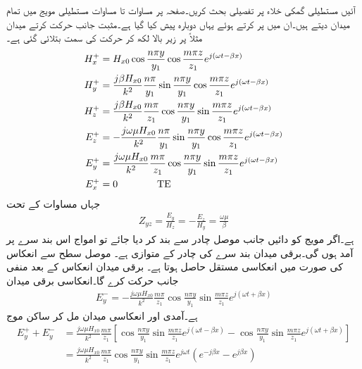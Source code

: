 آئیں مستطیلی گمکی خلاء پر تفصیلی بحث کریں۔صفحہ  پر مساوات  تا مساوات  مستطیلی مویج میں تمام  میدان دیتے ہیں۔ان میں  پر کرتے ہوئے یہاں دوبارہ پیش کیا گیا ہے۔مثبت  جانب حرکت کرتے میدان مثلاً  پر زیر بالا  لکھ کر حرکت کی سمت بتلائی گئی ہے۔
 \begin{align}
H_x^{+}&=H_{x0} \cos \frac{n \pi y}{y_1}  \cos  \frac{m \pi z}{z_1} e^{j (\omega t -\beta x)}\\
H_y^{+}&=\frac{j \beta H_{x0}}{k^2}\frac{n \pi}{y_1} \sin \frac{n\pi y}{y_1} \cos \frac{m \pi z}{z_1} e^{j (\omega t -\beta x)} \\
H_z^{+}&=\frac{j \beta H_{x0}}{k^2}\frac{m \pi}{z_1} \cos \frac{n\pi y}{y_1} \sin \frac{m \pi z}{z_1} e^{j (\omega t -\beta x)}\\
E_z^{+}&=-\frac{j \omega \mu H_{x0}}{k^2}\frac{n \pi}{y_1} \sin \frac{n\pi y}{y_1} \cos \frac{m \pi z}{z_1} e^{j (\omega t -\beta x)}\\
E_y^{+}&=\frac{j \omega \mu H_{x0}}{k^2}\frac{m \pi}{z_1}\cos \frac{n\pi y}{y_1} \sin \frac{m \pi z}{z_1} e^{j (\omega t -\beta x)}\\
E_x^{+}&=0 \quad \quad \quad \quad \textup{TE}_{}
\end{align}
جہاں مساوات  کے تحت
\begin{align}
Z_{yz}=\frac{E_y}{H_z}=-\frac{E_z}{H_y}=\frac{\omega \mu}{\beta}
\end{align}
ہے۔اگر مویج کو دائیں جانب موصل چادر سے بند کر دیا جائے تو امواج اس بند سرے پر   آمد ہوں گی۔برقی میدان  بند سرے کی چادر کے متوازی ہے۔ موصل سطح سے انعکاس کی صورت میں انعکاسی مستقل  حاصل ہوتا ہے۔ برقی میدان انعکاس کے بعد منفی  جانب حرکت کرے گا۔انعکاسی برقی میدان
\begin{align}
E_y^{-}=-\frac{j \omega \mu H_{x0}}{k^2}\frac{m \pi}{z_1}\cos \frac{n\pi y}{y_1} \sin \frac{m \pi z}{z_1} e^{j (\omega t +\beta x)}
\end{align} 
ہے۔آمدی اور انعکاسی میدان مل کر ساکن موج
\begin{align*}
E_y^{+}+E_y^{-}&=\frac{j \omega \mu  H_{x0}}{k^2}\frac{m \pi}{z_1}\left[\cos \frac{n\pi y}{y_1} \sin \frac{m \pi z}{z_1} e^{j (\omega t -\beta x)}-\cos \frac{n\pi y}{y_1} \sin \frac{m \pi z}{z_1} e^{j (\omega t +\beta x)}\right]\\
&=\frac{j \omega \mu H_{x0}}{k^2}\frac{m \pi}{z_1}\cos \frac{n\pi y}{y_1} \sin \frac{m \pi z}{z_1}e^{j\omega t} \left(e^{-j\beta  x} - e^{j \beta x}\right)
\end{align*}
